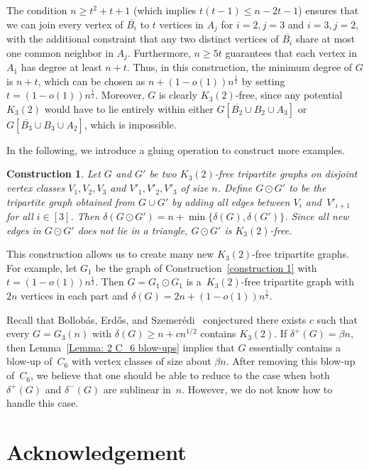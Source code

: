 \documentclass[11pt]{article}
\newtheorem{construction}[theorem]{Construction}
\numberwithin{equation}{section}
\begin{document}
The condition $n\geq t^2 + t+1$ (which implies $t(t-1)\le n-2t-1$) ensures that we can join every vertex of $\overline{B_i}$ to $t$ vertices in $A_j$ for $i = 2, j = 3$ and $i = 3, j = 2$, with the additional constraint that any two distinct vertices of $\overline{B_i}$ share at most one common neighbor in $A_j$. Furthermore, $n\geq 5t$ guarantees that each vertex in $A_1$ has degree at least $n+t$. Thus, in this construction, the minimum degree of $G$ is $n+t$, which can be chosen as $n+(1-o(1))n^{\frac{1}{2}}$ by setting $t = (1-o(1))n^{\frac{1}{2}}$. Moreover, $G$ is clearly $K_3(2)$-free, since any potential $K_3(2)$ would have to lie entirely within either $G[\overline{B_2}\cup B_2 \cup A_3]$ or $G[\overline{B_3}\cup B_3 \cup A_2]$, which is impossible.

In the following, we introduce a gluing operation to construct more examples.
\begin{construction}\label{gluing}
Let $G$ and $G'$ be two $K_3(2)$-free tripartite graphs on disjoint vertex classes $V_1, V_2,V_3$ and $V'_1, V'_2,V'_3$ of size $n$. 
Define $G \odot G'$ to be the tripartite graph obtained from $G \cup G'$ by adding all edges between $V_i$ and~$V'_{i+1}$ for all $i \in [3]$. Then $\delta(G \odot G')= n+ \min \{ \delta(G), \delta(G')\}$.
Since all new edges in $G \odot G'$ does not lie in a triangle, $G \odot G'$ is $K_3(2)$-free.
\end{construction}

This construction allows us to create many new $K_3(2)$-free tripartite graphs. 
For example, let $G_1$ be the graph of Construction~\ref{construction 1} with $t = (1-o(1))n^{\frac{1}{2}}$.
Then $G = G_1 \odot G_1$ is a~$K_3(2)$-free tripartite graph with $2n$ vertices in each part and $\delta(G) = 2n+ (1-o(1))n^{\frac{1}{2}}$.
\medskip

Recall that Bollob\'{a}s, Erd\H{o}s, and Szemer\'{e}di~\cite{bollobas1975complete} conjectured there exists $c$ such that every $G = G_3(n)$ with $\delta(G) \ge n + cn^{1/2}$ contains $K_3(2)$. 
If $\delta^+(G) = \beta n$, then Lemma~\ref{Lemma: 2 C_6 blow-ups} implies that $G$ essentially contains a blow-up of~$C_6$ with vertex classes of size about $\beta n$. 
After removing this blow-up of~$C_6$, we believe that one should be able to reduce to the case when both $\delta^+(G)$ and $\delta^-(G)$ are sublinear in~$n$.
However, we do not know how to handle this case. 


	
	
	
	\section*{Acknowledgement}
	
\end{document}
